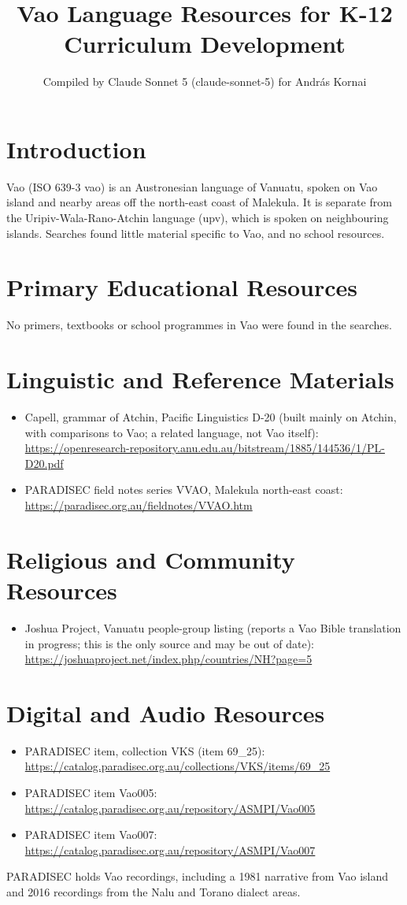 \documentclass[12pt]{article}
\title{Vao Language Resources for K-12 Curriculum Development}
\author{Compiled by Claude Sonnet 5 (claude-sonnet-5) for Andr\'as Kornai}
\date{}
\begin{document}
\maketitle

\section{Introduction}
Vao (ISO 639-3 vao) is an Austronesian language of Vanuatu, spoken on Vao island and nearby areas off the north-east coast of Malekula. It is separate from the Uripiv-Wala-Rano-Atchin language (upv), which is spoken on neighbouring islands. Searches found little material specific to Vao, and no school resources.

\section{Primary Educational Resources}
No primers, textbooks or school programmes in Vao were found in the searches.

\section{Linguistic and Reference Materials}
\begin{itemize}
\item Capell, grammar of Atchin, Pacific Linguistics D-20 (built mainly on Atchin, with comparisons to Vao; a related language, not Vao itself): \url{https://openresearch-repository.anu.edu.au/bitstream/1885/144536/1/PL-D20.pdf}
\item PARADISEC field notes series VVAO, Malekula north-east coast: \url{https://paradisec.org.au/fieldnotes/VVAO.htm}
\end{itemize}

\section{Religious and Community Resources}
\begin{itemize}
\item Joshua Project, Vanuatu people-group listing (reports a Vao Bible translation in progress; this is the only source and may be out of date): \url{https://joshuaproject.net/index.php/countries/NH?page=5}
\end{itemize}

\section{Digital and Audio Resources}
\begin{itemize}
\item PARADISEC item, collection VKS (item 69\_25): \url{https://catalog.paradisec.org.au/collections/VKS/items/69_25}
\item PARADISEC item Vao005: \url{https://catalog.paradisec.org.au/repository/ASMPI/Vao005}
\item PARADISEC item Vao007: \url{https://catalog.paradisec.org.au/repository/ASMPI/Vao007}
\end{itemize}
PARADISEC holds Vao recordings, including a 1981 narrative from Vao island and 2016 recordings from the Nalu and Torano dialect areas.
\end{document}
